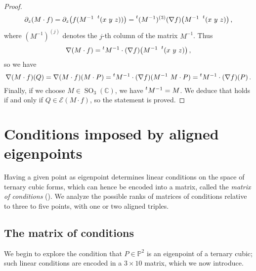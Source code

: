 \documentclass[a4paper, 11pt, reqno]{amsart}
\theoremstyle{plain}
\theoremstyle{definition}
\newcommand{\C}{\mathbb{C}}
\newcommand{\p}{\mathbb{P}}
\newcommand{\SO}{\operatorname{SO}}
\newcommand{\Eig}[1]{\mathcal{E}\!\left( {#1} \right)}
\begin{document}
\begin{proof}
\begin{gather*}
  \partial_z (M\cdot f) = \partial_z \bigl( f(M^{-1} \ \prescript{t} {} (x \ y \ z)) \bigr) = \prescript{t} {}(M^{-1})^{(3)}(\nabla f) \bigl( M^{-1}\ \prescript{t} {} (x \ y \ z) \bigr) \,,
\end{gather*}
%
where $(M^{-1})^{(j)}$ denotes the $j$-th column of the matrix $M^{-1}$. Thus
%
\[
  \nabla (M \cdot f) = \prescript{t} {} M^{-1} \cdot (\nabla f) \bigl(M^{-1}\ \prescript{t} {} (x \ y \ z)\bigr) \,,
\]
%
so we have
%
\[
  \nabla (M \cdot f)(Q)=\nabla (M \cdot f)(M \cdot P)=
  \prescript{t} {} M^{-1} \cdot (\nabla f) (M^{-1}\ M \cdot P)=\prescript{t} {} M^{-1} \cdot (\nabla f)(P) \,.
\]
%
Finally, if we choose $M \in \SO_3(\C)$, we have
$\prescript{t} {} M^{-1}=M$. We deduce that
 holds if and only if $Q \in \Eig{M\cdot f}$, so the statement is proved.
\end{proof}


\section{Conditions imposed by aligned eigenpoints}
\label{conditions}

Having a given point as eigenpoint determines linear conditions on the space of ternary cubic forms, 
which can hence be encoded into a matrix, called the \emph{matrix of conditions} (). 
We analyze the possible ranks of matrices of conditions relative to three to five points, with one or two aligned triples.

\subsection{The matrix of conditions}

We begin to explore the condition that $P\in \p^2$ is an eigenpoint of a ternary cubic; such linear conditions are encoded in
a $3 \times 10$ matrix, which we now introduce.
\end{document}
